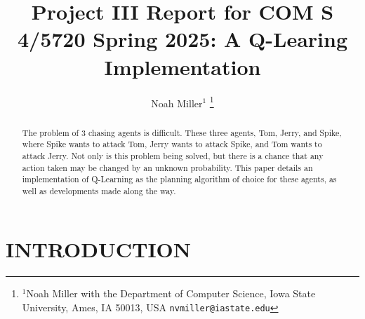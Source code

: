 \documentclass[letterpaper, 10 pt, conference]{ieeeconf}   %
\title{\LARGE \bf
Project III Report for COM S 4/5720 Spring 2025: A Q-Learing Implementation
}
\author{Noah Miller$^{1}$%
\thanks{$^{1}$Noah Miller with the Department of Computer Science, Iowa State University,
        Ames, IA 50013, USA
        {\tt\small nvmiller@iastate.edu}}%
}
\begin{document}
\maketitle
\thispagestyle{empty}
\pagestyle{empty}


\begin{abstract}

	The problem of 3 chasing agents is difficult. These three agents, Tom, Jerry, and Spike, where Spike wants to attack Tom, Jerry wants to attack Spike, and Tom wants to attack Jerry.
	Not only is this problem being solved, but there is a chance that any action taken may be changed by an unknown probability.
	This paper details an implementation of Q-Learning as the planning algorithm of choice for these agents, as well as developments made along the way.

\end{abstract}




\section{INTRODUCTION}
\end{document}
